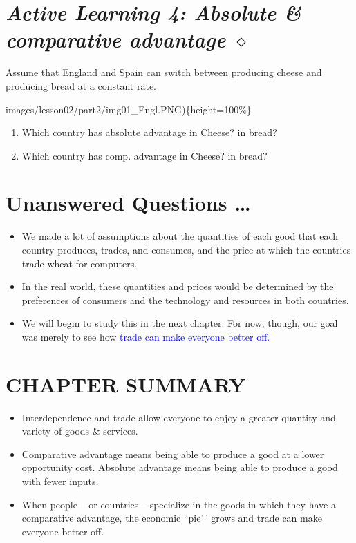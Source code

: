 \documentclass[
]{book}
\begin{document}
\hypertarget{active-learning-4-absolute-comparative-advantage-diamond}{%
\section{\texorpdfstring{\emph{Active Learning 4: Absolute \& comparative advantage} \(\diamond\)}{Active Learning 4: Absolute \& comparative advantage \textbackslash diamond}}\label{active-learning-4-absolute-comparative-advantage-diamond}}

Assume that England and Spain can switch between producing cheese and producing bread at a constant rate.

images/lesson02/part2/img01\_Engl.PNG)\{height=100\%\}

\begin{enumerate}
\def\labelenumi{\alph{enumi}.}
\item
  Which country has absolute advantage in Cheese? in bread?
\item
  Which country has comp. advantage in Cheese? in bread?
\end{enumerate}

\hypertarget{unanswered-questions}{%
\section{\texorpdfstring{Unanswered Questions \ldots }{Unanswered Questions }}\label{unanswered-questions}}

\begin{itemize}
\item
  We made a lot of assumptions about the quantities of each good that each country produces, trades, and consumes, and the price at which the countries trade wheat for computers.
\item
  In the real world, these quantities and prices would be determined by the preferences of consumers and the technology and resources in both countries.
\item
  We will begin to study this in the next chapter. For now, though, our goal was merely to see how \textcolor{blue}{trade can make everyone better off.}
\end{itemize}

\hypertarget{chapter-summary}{%
\section{CHAPTER SUMMARY}\label{chapter-summary}}

\begin{itemize}
\item
  Interdependence and trade allow everyone to enjoy a greater quantity and variety of goods \& services.
\item
  Comparative advantage means being able to produce a good at a lower opportunity cost. Absolute advantage means being able to produce a good with fewer inputs.
\item
  When people -- or countries -- specialize in the goods in which they have a comparative advantage, the economic ``pie'\,' grows and trade can make everyone better off.
\end{itemize}
\end{document}
